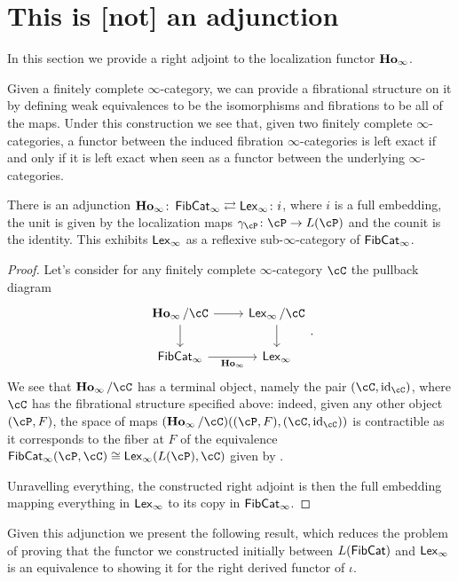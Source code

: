 \documentclass[a4paper,12pt,openany]{scrartcl}
\begin{document}
\section{This is [not] an adjunction}

In this section we provide a right adjoint to the localization functor $\operatorname{\mathbf{Ho}_\infty}$.

\begin{rmk}
  Given a finitely complete $\infty$-category, we can provide a fibrational
  structure on it by defining weak equivalences to be the isomorphisms and
  fibrations to be all of the maps. Under this construction we see that, given
  two finitely complete $\infty$-categories, a functor between the induced
  fibration $\infty$-categories is left exact if and only if it is left exact
  when seen as a functor between the underlying $\infty$-categories.
\end{rmk}

\begin{prop}\label{adj}
  There is an adjunction $\operatorname{\mathbf{Ho}_\infty}\colon\operatorname{\mathsf{FibCat}}_\infty\rightleftarrows\operatorname{\mathsf{Lex}_\infty}\colon
  i$, where $i$ is a full embedding, the unit is given by the
  localization maps $\gamma_{\cP}\colon\cP\rightarrow L(\cP)$ and the counit is
  the identity. This exhibits $\operatorname{\mathsf{Lex}_\infty}$ as a reflexive sub-$\infty$-category of
  $\operatorname{\mathsf{FibCat}}_\infty$.
\end{prop}
\begin{proof}
  Let's consider for any finitely complete $\infty$-category $\cC$ the pullback
  diagram
  \[\begin{tikzcd}
    {\Hoi/\cC} & {\Lexi/\cC} \\
    {\FibCat_\infty} & {\Lexi}
    \arrow["\Hoi"', from=2-1, to=2-2]
    \arrow[from=1-2, to=2-2]
    \arrow[from=1-1, to=2-1]
    \arrow[from=1-1, to=1-2]
  \end{tikzcd}.\]
  We see that $\Hoi/\cC$ has a terminal object, namely the pair $(\cC,\id_\cC)$,
  where $\cC$ has the fibrational structure specified above: indeed, given any
  other object $(\cP,F)$, the space of maps
  $(\Hoi/\cC)((\cP,F),(\cC,\id_\cC))$ is contractible as it corresponds to the
  fiber at $F$ of the equivalence
  $\FibCat_\infty(\cP,\cC)\cong\Lexi(L(\cP),\cC)$ given by \cite[Prop.\
  7.5.11]{Cis19}.

  Unravelling everything, the constructed right adjoint is then the full
  embedding mapping everything in $\operatorname{\mathsf{Lex}_\infty}$ to its copy in $\operatorname{\mathsf{FibCat}}_\infty$.
\end{proof}

Given this adjunction we present the following result, which reduces the
problem of proving that the functor we constructed initially between $L(\operatorname{\mathsf{FibCat}})$
and $\operatorname{\mathsf{Lex}_\infty}$ is an equivalence to showing it for the right derived functor of
$\iota$.
\end{document}
